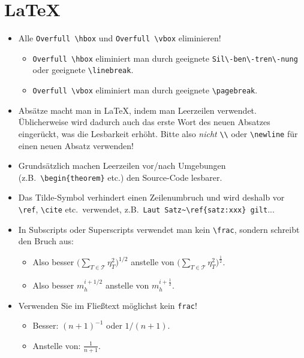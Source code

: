 \documentclass[a4paper,11pt,bibliography=totoc,listof=totoc,headinclude=true,cleardoublepage=empty,oneside]{scrbook}
\begin{document}
\section{LaTeX}

{\color{change}
\begin{itemize}

\item Alle \verb$Overfull \hbox$ und \verb$Overfull \vbox$ eliminieren!
\begin{itemize}
\item \verb$Overfull \hbox$ eliminiert man durch geeignete \verb$Sil\-ben\-tren\-nung$ oder geeignete \verb$\linebreak$.
\item \verb$Overfull \vbox$ eliminiert man durch geeignete \verb$\pagebreak$.
\end{itemize}

\item Absätze macht man in \LaTeX, indem man Leerzeilen verwendet. Üblicherweise wird dadurch auch das erste Wort des neuen Absatzes eingerückt, was die Lesbarkeit erhöht. Bitte also \emph{nicht} \verb$\\$ oder \verb$\newline$ für einen neuen Absatz verwenden! 
\item Grundsätzlich machen Leerzeilen vor/nach Umgebungen (z.B.\ \verb$\begin{theorem}$ etc.) den Source-Code lesbarer.
\item Das Tilde-Symbol verhindert einen Zeilenumbruch und wird deshalb vor \verb$\ref$, \verb$\cite$ etc.\ verwendet, z.B.\ \verb$Laut Satz~\ref{satz:xxx} gilt$...

\item In Subscripts oder Superscripts verwendet man kein \verb$\frac$, sondern schreibt den Bruch aus:
\begin{itemize}
\item Also besser $\displaystyle \bigg(\sum_{T \in \mathcal T} \eta_T^2\bigg)^{1/2}$ anstelle von
$\displaystyle \bigg(\sum_{T \in \mathcal T} \eta_T^2\bigg)^{\frac{1}{2}}$.
\item Also besser $m_h^{i+1/2}$ anstelle von $m_h^{i+\frac{1}{2}}$.
\end{itemize}

\item Verwenden Sie im Fließtext möglichst kein \verb$frac$!
\begin{itemize}
\item Besser: $(n+1)^{-1}$ oder $1/(n+1)$.
\item Anstelle von: $\frac{1}{n+1}$.
\end{itemize}


\end{itemize}}
\end{document}
